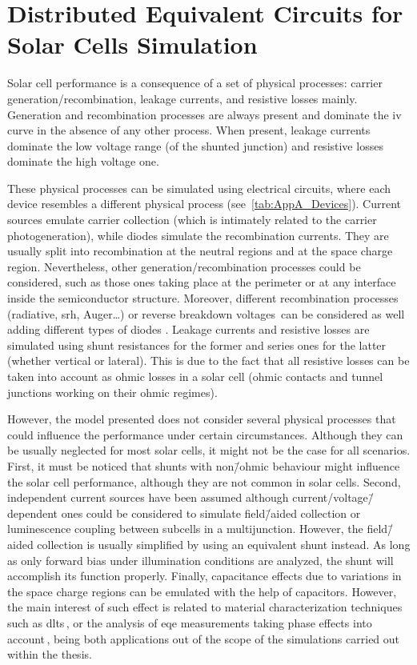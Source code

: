 \chapter{Distributed Equivalent Circuits for Solar Cells Simulation}\label{ch:App_Distributed}
Solar cell performance is a consequence of a set of physical processes: carrier generation/recombination, leakage currents, and resistive losses mainly. Generation and recombination processes are always present and dominate the \gls{iv} curve in the absence of any other process. When present, leakage currents dominate the low voltage range (of the shunted junction) and resistive losses dominate the high voltage one.

These physical processes can be simulated using electrical circuits, where each device resembles a different physical process (see \tab\,\ref{tab:AppA_Devices}). Current sources emulate carrier collection (which is intimately related to the carrier photogeneration), while diodes simulate the recombination currents. They are usually split into recombination at the neutral regions and at the space charge region. Nevertheless, other generation/recombination processes could be considered, such as those ones taking place at the perimeter or at any interface inside the semiconductor structure. Moreover, different recombination processes (radiative, \gls{srh}, Auger\ldots) or reverse breakdown voltages\,\cite{Meusel2003,Barrigon2012} can be considered as well adding different types of diodes \cite{Espinet-Gonzalez2015}. Leakage currents and resistive losses are simulated using shunt resistances for the former and series ones for the latter (whether vertical or lateral). This is due to the fact that all resistive losses can be taken into account as ohmic losses in a \soa{} solar cell (ohmic contacts and tunnel junctions working on their ohmic regimes).

However, the model presented does not consider several physical processes that could influence the performance under certain circumstances. Although they can be usually neglected for most solar cells, it might not be the case for all scenarios. First, it must be noticed that shunts with non\=/ohmic behaviour \cite{Breitenstein2012,Breitenstein2003} might influence the solar cell performance, although they are not common in \soa{} \iiiv{} solar cells. Second, independent current sources have been assumed although current/voltage\=/dependent ones could be considered to simulate field\=/aided collection or luminescence coupling between subcells in a multijunction. However, the field\=/aided collection is usually simplified by using an equivalent shunt instead. As long as only forward bias under illumination conditions are analyzed, the shunt will accomplish its function properly. Finally, capacitance effects due to variations in the space charge regions can be emulated with the help of capacitors. However, the main interest of such effect is related to material characterization techniques such as \gls{dlts}\,\cite{Ptak2003}, or the analysis of \gls{eqe} measurements taking phase effects into account\,\cite{Steiner2012}, being both applications out of the scope of the simulations carried out within the thesis. 

